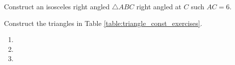 \item Construct  an isosceles right angled $\triangle ABC$ right angled at $C$ such $AC = 6$.
\\
\solution


\item Construct the  triangles in Table \ref{table:triangle_const_exercises}.
\begin{table}[!ht]
\centering

\caption{}
\label{table:triangle_const_exercises}
\end{table}
\solution
\begin{enumerate}
    \item
    \item 
    \solution
    
    \item 
    \solution
    
        
\end{enumerate}
%
